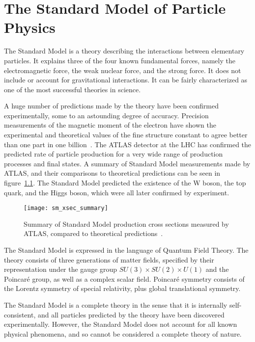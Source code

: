 \chapter{The Standard Model of Particle Physics}\label{ch:sm}

The Standard Model is a theory describing the interactions between elementary particles.
It explains three of the four known fundamental forces, namely the electromagnetic force,
the weak nuclear force, and the strong force.
It does not include  or account for gravitational interactions.
It can be fairly characterized as one of the most successful theories in science.

A huge number of predictions made by the theory have been confirmed experimentally, some to an astounding degree of accuracy.
Precision measurements of the magnetic moment of the electron have shown the experimental and theoretical values of the fine structure constant to agree better than one part in one billion~\cite{sm-fine-structure-2008}.
The ATLAS detector at the LHC has confirmed the predicted rate of particle production for a very wide range of production processes and final states.
A summary of Standard Model measurements made by ATLAS, and their comparisons to theoretical predictions can be seen in figure~\ref{fig:sm_xsec_summary}.
The Standard Model predicted the existence of the W boson, the top quark, and the Higgs boson, which were all later confirmed by experiment.

\begin{figure}[!ht]
    \centering
\texttt{[image: sm\_xsec\_summary]}
\caption{Summary of Standard Model production cross sections measured by ATLAS, compared to theoretical predictions~\cite{sm-summary-plots}.}
\label{fig:sm_xsec_summary}
\end{figure}

The Standard Model is expressed in the language of Quantum Field Theory.
The theory consists of three generations of matter fields, specified by their representation under the gauge group $SU(3)\times SU(2)\times U(1)$ and the Poincar\'e group, as well as a complex scalar field.
Poincar\'e symmetry consists of the Lorentz symmetry of special relativity, plus global translational symmetry.

The Standard Model is a complete theory in the sense that it is internally self-consistent,
and all particles predicted by the theory have been discovered experimentally.
However, the Standard Model does not account for all known physical phenomena,
and so cannot be considered a complete theory of nature.

